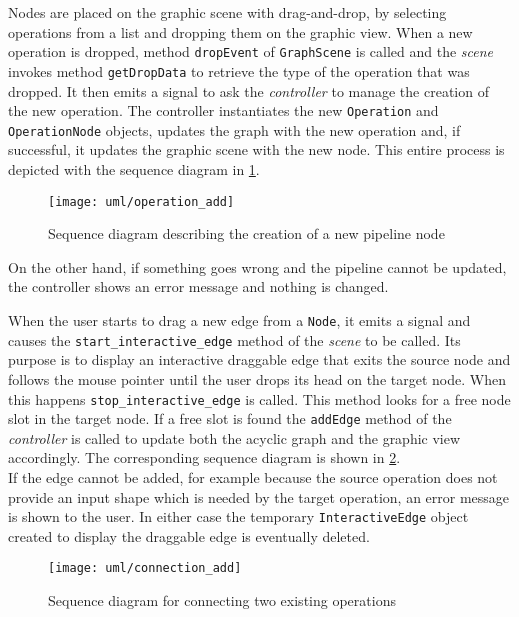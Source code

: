 Nodes are placed on the graphic scene with drag-and-drop, by selecting operations from a list and dropping them on the graphic view. When a new operation is dropped, method \texttt{dropEvent} of \texttt{GraphScene} is called and the \textit{scene} invokes method \texttt{getDropData} to retrieve the type of the operation that was dropped. It then emits a signal to ask the \textit{controller} to manage the creation of the new operation. The controller instantiates the new \texttt{Operation} and \texttt{OperationNode} objects, updates the graph with the new operation and, if successful, it updates the graphic scene with the new node. This entire process is depicted with the sequence diagram in \cref{fig:add_node_seq}.
\begin{figure}
	\centering
	\texttt{[image: uml/operation\_add]}
	\caption{Sequence diagram describing the creation of a new pipeline node}
	\label{fig:add_node_seq}
\end{figure}
On the other hand, if something goes wrong and the pipeline cannot be updated, the controller shows an error message and nothing is changed.

When the user starts to drag a new edge from a \texttt{Node}, it emits a signal and causes the \texttt{start\_interactive\_edge} method of the \textit{scene} to be called. Its purpose is to display an interactive draggable edge that exits the source node and follows the mouse pointer until the user drops its head on the target node. When this happens \texttt{stop\_interactive\_edge} is called. This method looks for a free node slot in the target node. If a free slot is found the \texttt{addEdge} method of the \textit{controller} is called to update both the acyclic graph and the graphic view accordingly. The corresponding sequence diagram is shown in \cref{fig:add_edge_seq}. \\
If the edge cannot be added, for example because the source operation does not provide an input shape which is needed by the target operation, an error message is shown to the user. In either case the temporary \texttt{InteractiveEdge} object created to display the draggable edge is eventually deleted.
\begin{figure}
	\centering
	\texttt{[image: uml/connection\_add]}
	\caption{Sequence diagram for connecting two existing operations}
	\label{fig:add_edge_seq}
\end{figure}

